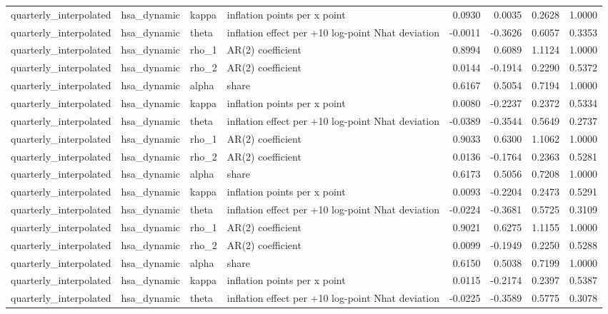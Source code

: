 \begin{tabular}{llllrrrr}
quarterly\_interpolated & hsa\_dynamic & kappa & inflation points per x point & 0.0930 & 0.0035 & 0.2628 & 1.0000 \\
quarterly\_interpolated & hsa\_dynamic & theta & inflation effect per +10 log-point Nhat deviation & -0.0011 & -0.3626 & 0.6057 & 0.3353 \\
quarterly\_interpolated & hsa\_dynamic & rho\_1 & AR(2) coefficient & 0.8994 & 0.6089 & 1.1124 & 1.0000 \\
quarterly\_interpolated & hsa\_dynamic & rho\_2 & AR(2) coefficient & 0.0144 & -0.1914 & 0.2290 & 0.5372 \\
quarterly\_interpolated & hsa\_dynamic & alpha & share & 0.6167 & 0.5054 & 0.7194 & 1.0000 \\
quarterly\_interpolated & hsa\_dynamic & kappa & inflation points per x point & 0.0080 & -0.2237 & 0.2372 & 0.5334 \\
quarterly\_interpolated & hsa\_dynamic & theta & inflation effect per +10 log-point Nhat deviation & -0.0389 & -0.3544 & 0.5649 & 0.2737 \\
quarterly\_interpolated & hsa\_dynamic & rho\_1 & AR(2) coefficient & 0.9033 & 0.6300 & 1.1062 & 1.0000 \\
quarterly\_interpolated & hsa\_dynamic & rho\_2 & AR(2) coefficient & 0.0136 & -0.1764 & 0.2363 & 0.5281 \\
quarterly\_interpolated & hsa\_dynamic & alpha & share & 0.6173 & 0.5056 & 0.7208 & 1.0000 \\
quarterly\_interpolated & hsa\_dynamic & kappa & inflation points per x point & 0.0093 & -0.2204 & 0.2473 & 0.5291 \\
quarterly\_interpolated & hsa\_dynamic & theta & inflation effect per +10 log-point Nhat deviation & -0.0224 & -0.3681 & 0.5725 & 0.3109 \\
quarterly\_interpolated & hsa\_dynamic & rho\_1 & AR(2) coefficient & 0.9021 & 0.6275 & 1.1155 & 1.0000 \\
quarterly\_interpolated & hsa\_dynamic & rho\_2 & AR(2) coefficient & 0.0099 & -0.1949 & 0.2250 & 0.5288 \\
quarterly\_interpolated & hsa\_dynamic & alpha & share & 0.6150 & 0.5038 & 0.7199 & 1.0000 \\
quarterly\_interpolated & hsa\_dynamic & kappa & inflation points per x point & 0.0115 & -0.2174 & 0.2397 & 0.5387 \\
quarterly\_interpolated & hsa\_dynamic & theta & inflation effect per +10 log-point Nhat deviation & -0.0225 & -0.3589 & 0.5775 & 0.3078 \\

\end{tabular}

